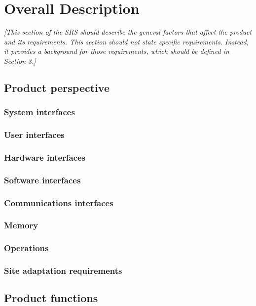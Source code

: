 \documentclass{article}
\begin{document}

\section{Overall Description}
\label{sec:overall}

\emph{[This section of the SRS should describe the general factors that
  affect the product and its requirements. This section should not state
  specific requirements. Instead, it provides a background for those
  requirements, which should be defined in Section 3.]}

\subsection{Product perspective}

\subsubsection{System interfaces}
\subsubsection{User interfaces}
\subsubsection{Hardware interfaces}
\subsubsection{Software interfaces}
\subsubsection{Communications interfaces}
\subsubsection{Memory}
\subsubsection{Operations}
\subsubsection{Site adaptation requirements}

\subsection{Product functions}
\end{document}
